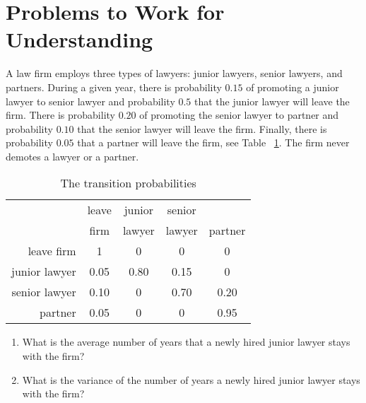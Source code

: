 \documentclass[12pt]{article}
\begin{document}
\section*{Problems to Work for Understanding}

\renewcommand{\theexerciseseries}{}
\renewcommand{\theexercise}{\arabic{exercise}}

\begin{exercise}
    A law firm employs three types of lawyers:  junior lawyers, senior
    lawyers, and partners.  During a given year, there is probability \(
    0.15 \) of promoting a junior lawyer to senior lawyer and
    probability \( 0.5 \) that the junior lawyer will leave the firm.
    There is probability \( 0.20 \) of promoting the senior lawyer to
    partner and probability \( 0.10 \) that the senior lawyer will leave
    the firm.  Finally, there is probability \( 0.05 \) that a partner
    will leave the firm, see Table~%
    \ref{tab:newwaitingtimeabsorption:lawyers}. The firm never demotes a
    lawyer or a partner.

    \begin{table}[htbp]
        \caption[]{The transition probabilities }
        \vspace{4mm}
        \begin{tabular}[tb]
            {r|cccc}    & leave & junior        & senior        & \\
                & firm  & lawyer        & lawyer        & partner \\
            \hline
            leave firm  & 1     & 0     & 0     & 0 \\
            junior lawyer       & 0.05  & 0.80  & 0.15  & 0 \\
            senior lawyer       & 0.10  & 0     & 0.70  & 0.20 \\
            partner     & 0.05  & 0     & 0     & 0.95
        \end{tabular}
        \label{tab:newwaitingtimeabsorption:lawyers}
    \end{table}

    \begin{enumerate}
        \item
            What is the average number of years that a newly hired
            junior lawyer stays with the firm?
        \item
            What is the variance of the number of years a newly hired
            junior lawyer stays with the firm?
    \end{enumerate}
\end{exercise}
\end{document}
